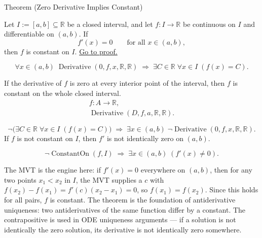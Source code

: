 
\begin{theorembox}{Theorem (Zero Derivative Implies Constant)}
\begin{theorem}
\label{thm:zero-derivative-implies-constant}
Let $I := [a,b] \subseteq \mathbb{R}$ be a closed interval, and let $f : I \to \mathbb{R}$ be continuous on $I$ and differentiable on $(a,b)$. If
\[
f'(x) = 0 \qquad \text{for all } x \in (a,b),
\]
then $f$ is constant on $I$.
\hyperref[prf:zero-derivative-implies-constant]{Go to proof.}
\end{theorem}
\end{theorembox}

\begin{remark*}
\[
\forall x \in (a,b)\;\operatorname{Derivative}(0,f,x,\mathbb{R},\mathbb{R})
\;\Rightarrow\;
\exists C \in \mathbb{R}\;\forall x \in I\;(f(x) = C).
\]
\end{remark*}

\begin{remark*}
If the derivative of $f$ is zero at every interior point of the interval,
then $f$ is constant on the whole closed interval.
\[
\begin{aligned}
  f\colon A\to\mathbb{R},\\
  \operatorname{Derivative}(D,f,a,\mathbb{R},\mathbb{R}).
\end{aligned}
\]
\end{remark*}

\begin{remark*}[Interpretation]
\[
\lnot\bigl(\exists C \in \mathbb{R}\;\forall x \in I\;(f(x)=C)\bigr)
\;\Rightarrow\;
\exists x \in (a,b)\;\lnot\operatorname{Derivative}(0,f,x,\mathbb{R},\mathbb{R}).
\]
If $f$ is not constant on $I$, then $f'$ is not identically zero on $(a,b)$.


\[
\lnot\operatorname{ConstantOn}(f,I) \;\Rightarrow\; \exists x \in (a,b)\;(f'(x) \neq 0).
\]


The MVT is the engine here: if $f'(x) = 0$ everywhere on $(a,b)$, then for any two points $x_1 < x_2$ in $I$, the MVT supplies a $c$ with $f(x_2)-f(x_1) = f'(c)(x_2-x_1) = 0$, so $f(x_1) = f(x_2)$. Since this holds for all pairs, $f$ is constant. The theorem is the foundation of antiderivative uniqueness: two antiderivatives of the same function differ by a constant. The contrapositive is used in ODE uniqueness arguments --- if a solution is not identically the zero solution, its derivative is not identically zero somewhere.
\end{remark*}

